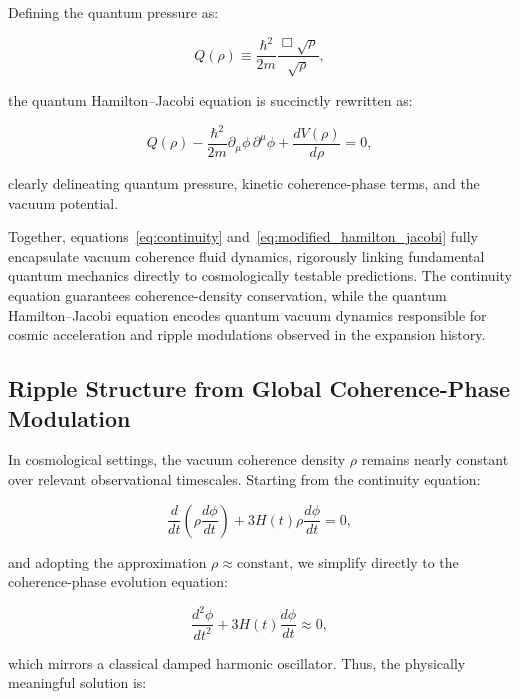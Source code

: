 Defining the quantum pressure as:

\begin{equation}
Q(\rho)\equiv \frac{\hbar^2}{2m}\frac{\Box\sqrt{\rho}}{\sqrt{\rho}},
\label{eq:quantum_pressure}
\end{equation}

the quantum Hamilton–Jacobi equation is succinctly rewritten as:

\begin{equation}
Q(\rho) - \frac{\hbar^2}{2m}\partial_\mu\phi\,\partial^\mu\phi + \frac{dV(\rho)}{d\rho} = 0,
\label{eq:modified_hamilton_jacobi}
\end{equation}

clearly delineating quantum pressure, kinetic coherence-phase terms, and the vacuum potential.

Together, equations~\eqref{eq:continuity} and~\eqref{eq:modified_hamilton_jacobi} fully encapsulate vacuum coherence fluid dynamics, rigorously linking fundamental quantum mechanics directly to cosmologically testable predictions. The continuity equation guarantees coherence-density conservation, while the quantum Hamilton–Jacobi equation encodes quantum vacuum dynamics responsible for cosmic acceleration and ripple modulations observed in the expansion history.

\subsection{Ripple Structure from Global Coherence-Phase Modulation}

In cosmological settings, the vacuum coherence density \(\rho\) remains nearly constant over relevant observational timescales. Starting from the continuity equation:

\begin{equation}
\frac{d}{dt}\left(\rho \frac{d\phi}{dt}\right) + 3H(t)\rho\frac{d\phi}{dt} = 0,
\label{eq:continuity_ripple}
\end{equation}

and adopting the approximation \(\rho \approx \text{constant}\), we simplify directly to the coherence-phase evolution equation:

\begin{equation}
\frac{d^2\phi}{dt^2}+3H(t)\frac{d\phi}{dt}\approx 0,
\label{eq:phase_evolution_cosmo}
\end{equation}

which mirrors a classical damped harmonic oscillator. Thus, the physically meaningful solution is:

